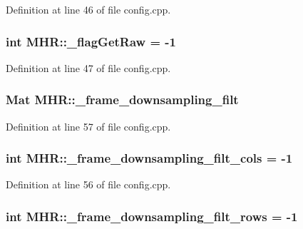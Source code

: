 Definition at line 46 of file config.\+cpp.

\hypertarget{namespace_m_h_r_ab142c69d1b89170b4fa2533a6f749394}{
\subsubsection[{\+\_\+flag\+Get\+Raw}]{\setlength{\rightskip}{0pt plus 5cm}int M\+H\+R\+::\+\_\+flag\+Get\+Raw = -\/1}}\label{namespace_m_h_r_ab142c69d1b89170b4fa2533a6f749394}


Definition at line 47 of file config.\+cpp.

\hypertarget{namespace_m_h_r_a8d2bbf36755f538d9b442b415d5cde6d}{
\subsubsection[{\+\_\+frame\+\_\+downsampling\+\_\+filt}]{\setlength{\rightskip}{0pt plus 5cm}Mat M\+H\+R\+::\+\_\+frame\+\_\+downsampling\+\_\+filt}}\label{namespace_m_h_r_a8d2bbf36755f538d9b442b415d5cde6d}


Definition at line 57 of file config.\+cpp.

\hypertarget{namespace_m_h_r_a619373c68caeeba93f71d9eaeecf1a5b}{
\subsubsection[{\+\_\+frame\+\_\+downsampling\+\_\+filt\+\_\+cols}]{\setlength{\rightskip}{0pt plus 5cm}int M\+H\+R\+::\+\_\+frame\+\_\+downsampling\+\_\+filt\+\_\+cols = -\/1}}\label{namespace_m_h_r_a619373c68caeeba93f71d9eaeecf1a5b}


Definition at line 56 of file config.\+cpp.

\hypertarget{namespace_m_h_r_a41fcc40bb1f54975292b8d7051b7b3f9}{
\subsubsection[{\+\_\+frame\+\_\+downsampling\+\_\+filt\+\_\+rows}]{\setlength{\rightskip}{0pt plus 5cm}int M\+H\+R\+::\+\_\+frame\+\_\+downsampling\+\_\+filt\+\_\+rows = -\/1}}\label{namespace_m_h_r_a41fcc40bb1f54975292b8d7051b7b3f9}


